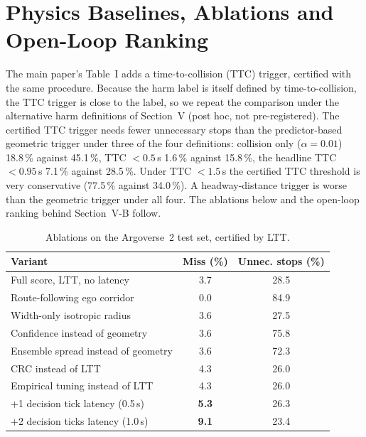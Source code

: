 \documentclass[lettersize,journal]{IEEEtran}
\begin{document}
\section{Physics Baselines, Ablations and Open-Loop Ranking}
\label{sec:s-physics}
The main paper's Table~I adds a time-to-collision (TTC) trigger, certified with the same procedure. Because the harm label is itself defined by time-to-collision, the TTC trigger is close to the label, so we repeat the comparison under the alternative harm definitions of Section~V (post hoc, not pre-registered). The certified TTC trigger needs fewer unnecessary stops than the predictor-based geometric trigger under three of the four definitions: collision only ($\alpha = 0.01$) 18.8\,\% against 45.1\,\%, TTC $<0.5$\,s 1.6\,\% against 15.8\,\%, the headline TTC $<0.95$\,s 7.1\,\% against 28.5\,\%. Under TTC $<1.5$\,s the certified TTC threshold is very conservative (77.5\,\% against 34.0\,\%). A headway-distance trigger is worse than the geometric trigger under all four. The ablations below and the open-loop ranking behind Section~V-B follow.

\begin{table}[h]
\caption{Ablations on the Argoverse~2 test set, certified by LTT.}
\label{tab:abl}
\centering
\footnotesize
\begin{tabular}{lcc}
\toprule
Variant & Miss (\%) & Unnec. stops (\%) \\
\midrule
Full score, LTT, no latency & 3.7 & 28.5 \\
Route-following ego corridor & 0.0 & 84.9 \\
Width-only isotropic radius & 3.6 & 27.5 \\
Confidence instead of geometry & 3.6 & 75.8 \\
Ensemble spread instead of geometry & 3.6 & 72.3 \\
CRC instead of LTT & 4.3 & 26.0 \\
Empirical tuning instead of LTT & 4.3 & 26.0 \\
+1 decision tick latency (0.5\,s) & \textbf{5.3} & 26.3 \\
+2 decision ticks latency (1.0\,s) & \textbf{9.1} & 23.4 \\
\bottomrule
\end{tabular}
\end{table}
\end{document}
